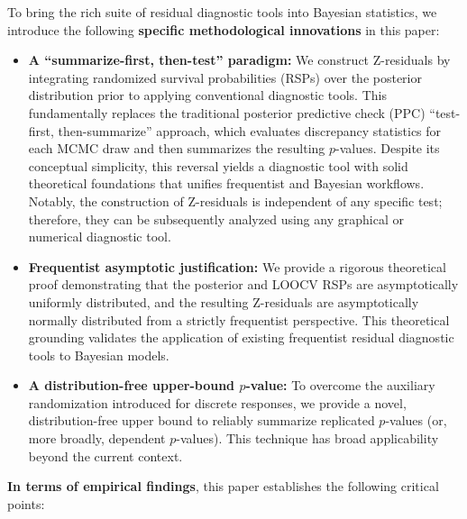 \documentclass[11pt]{article}
\begin{document}
To bring the rich suite of residual diagnostic tools into Bayesian statistics, we introduce the following \textbf{specific methodological innovations} in this paper:
\begin{itemize}
    \item \textbf{A ``summarize-first, then-test'' paradigm:} We construct Z-residuals by integrating randomized survival probabilities (RSPs) over the posterior distribution prior to applying conventional diagnostic tools. This fundamentally replaces the traditional posterior predictive check (PPC) ``test-first, then-summarize'' approach, which evaluates discrepancy statistics for each MCMC draw and then summarizes the resulting $p$-values. Despite its conceptual simplicity, this reversal yields a diagnostic tool with solid theoretical foundations that unifies frequentist and Bayesian workflows. Notably, the construction of Z-residuals is independent of any specific test; therefore, they can be subsequently analyzed using any graphical or numerical diagnostic tool.
    \item \textbf{Frequentist asymptotic justification:} We provide a rigorous theoretical proof demonstrating that the posterior and LOOCV RSPs are asymptotically uniformly distributed, and the resulting Z-residuals are asymptotically normally distributed from a strictly frequentist perspective. This theoretical grounding validates the application of existing frequentist residual diagnostic tools to Bayesian models. 
    \item \textbf{A distribution-free upper-bound $p$-value:} To overcome the auxiliary randomization introduced for discrete responses, we provide a novel, distribution-free upper bound to reliably summarize replicated $p$-values (or, more broadly, dependent $p$-values). This technique has broad applicability beyond the current context.
\end{itemize}

\textbf{In terms of empirical findings}, this paper establishes the following critical points: 
\end{document}
